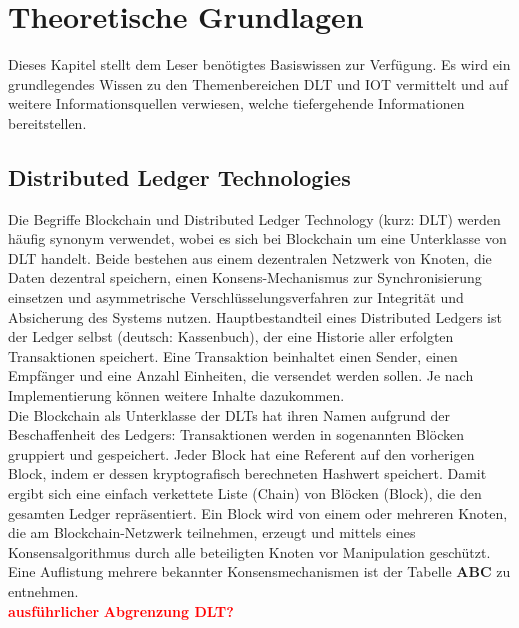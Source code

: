 \chapter{Theoretische Grundlagen}
\label{ch:fundamentals}
Dieses Kapitel stellt dem Leser benötigtes Basiswissen zur Verfügung. Es wird ein grundlegendes Wissen zu den Themenbereichen \ac{DLT} und \ac{IOT} vermittelt und auf weitere Informationsquellen verwiesen, welche tiefergehende Informationen bereitstellen.

%
%
\section{Distributed Ledger Technologies}
\label{sec:fundamentals:dlt}
Die Begriffe Blockchain und Distributed Ledger Technology (kurz: \ac{DLT}) werden häufig synonym verwendet, wobei es sich bei Blockchain um eine Unterklasse von \ac{DLT} handelt. Beide bestehen aus einem dezentralen Netzwerk von Knoten, die Daten dezentral speichern, einen Konsens-Mechanismus zur Synchronisierung einsetzen und asymmetrische Verschlüsselungsverfahren zur Integrität und Absicherung des Systems nutzen. Hauptbestandteil eines Distributed Ledgers ist der Ledger selbst (deutsch: Kassenbuch), der eine Historie aller erfolgten Transaktionen speichert. Eine Transaktion beinhaltet einen Sender, einen Empfänger und eine Anzahl Einheiten, die versendet werden sollen. Je nach Implementierung können weitere Inhalte dazukommen.\\
Die Blockchain als Unterklasse der \ac{DLT}s hat ihren Namen aufgrund der Beschaffenheit des Ledgers: Transaktionen werden in sogenannten Blöcken gruppiert und gespeichert. Jeder Block hat eine Referent auf den vorherigen Block, indem er dessen kryptografisch berechneten Hashwert speichert. Damit ergibt sich eine einfach verkettete Liste (Chain) von Blöcken (Block), die den gesamten Ledger repräsentiert. Ein Block wird von einem oder mehreren Knoten, die am Blockchain-Netzwerk teilnehmen, erzeugt und mittels eines Konsensalgorithmus durch alle beteiligten Knoten vor Manipulation geschützt. Eine Auflistung mehrere bekannter Konsensmechanismen ist der Tabelle \textbf{ABC} zu entnehmen.\\%
\textbf{\textcolor{red}{ausführlicher}}
\textbf{\textcolor{red}{Abgrenzung DLT?}}


